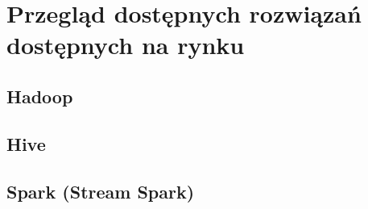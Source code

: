 \section{Przegląd dostępnych rozwiązań dostępnych na rynku}
\label{sec:solutions}



\subsection{Hadoop}
\label{sec:solutions:hadoop}



\subsection{Hive}
\label{sec:solutions:hive}



\subsection{Spark (Stream Spark)}
\label{sec:solutions:spark}


